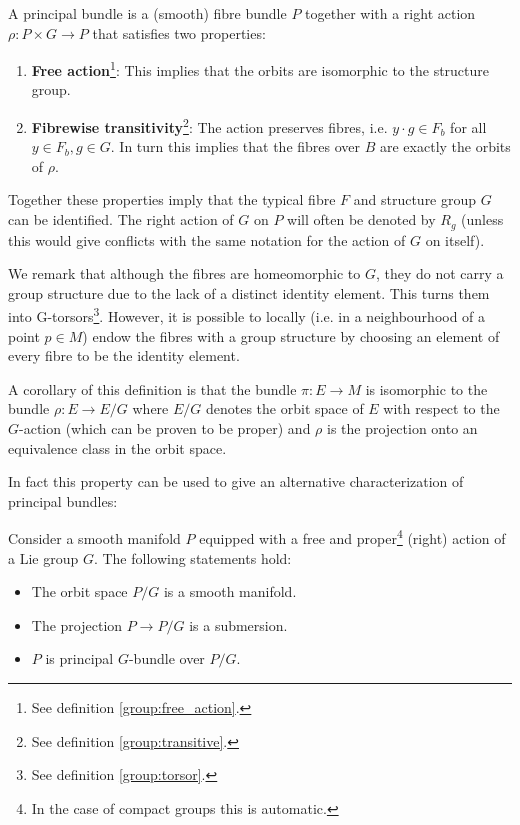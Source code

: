     \begin{definition}
        A principal bundle is a (smooth) fibre bundle $P$ together with a right action $\rho:P\times G\rightarrow P$ that satisfies two properties:
        \begin{enumerate}
            \item \textbf{Free action}\footnote{See definition \ref{group:free_action}.}: This implies that the orbits are isomorphic to the structure group.
            \item \textbf{Fibrewise transitivity}\footnote{See definition \ref{group:transitive}.}: The action preserves fibres, i.e. $y\cdot g\in F_b$ for all $y\in F_b, g\in G$. In turn this implies that the fibres over $B$ are exactly the orbits of $\rho$.
        \end{enumerate}
        Together these properties imply that the typical fibre $F$ and structure group $G$ can be identified. The right action of $G$ on $P$ will often be denoted by $R_g$ (unless this would give conflicts with the same notation for the action of $G$ on itself).
    \end{definition}
    \begin{remark}
        We remark that although the fibres are homeomorphic to $G$, they do not carry a group structure due to the lack of a distinct identity element. This turns them into G-torsors\footnote{See definition \ref{group:torsor}.}. However, it is possible to locally (i.e. in a neighbourhood of a point $p\in M$) endow the fibres with a group structure by choosing an element of every fibre to be the identity element.
    \end{remark}
    \begin{property}
        A corollary of this definition is that the bundle $\pi:E\rightarrow M$ is isomorphic to the bundle $\rho:E\rightarrow E/G$ where $E/G$ denotes the orbit space of $E$ with respect to the $G$-action (which can be proven to be proper) and $\rho$ is the projection onto an equivalence class in the orbit space.
    \end{property}
    In fact this property can be used to give an alternative characterization of principal bundles:
    \begin{property}
        Consider a smooth manifold $P$ equipped with a free and proper\footnote{In the case of compact groups this is automatic.} (right) action of a Lie group $G$. The following statements hold:
        \begin{itemize}
            \item The orbit space $P/G$ is a smooth manifold.
            \item The projection $P\rightarrow P/G$ is a submersion.
            \item $P$ is principal $G$-bundle over $P/G$.
        \end{itemize}
    \end{property}

